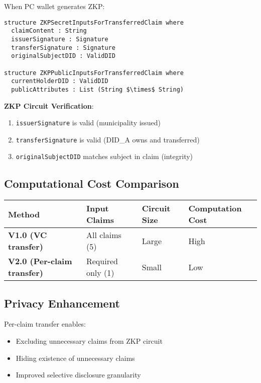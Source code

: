 When PC wallet generates ZKP:

\begin{verbatim}
structure ZKPSecretInputsForTransferredClaim where
  claimContent : String
  issuerSignature : Signature
  transferSignature : Signature
  originalSubjectDID : ValidDID

structure ZKPPublicInputsForTransferredClaim where
  currentHolderDID : ValidDID
  publicAttributes : List (String $\times$ String)
\end{verbatim}

\textbf{ZKP Circuit Verification}:
\begin{enumerate}
  \item \texttt{issuerSignature} is valid (municipality issued)
  \item \texttt{transferSignature} is valid (DID\_A owns and transferred)
  \item \texttt{originalSubjectDID} matches subject in claim (integrity)
\end{enumerate}

\subsection{Computational Cost Comparison}

\begin{table}[h]
\centering
\begin{tabular}{|l|l|l|l|}
\hline
\textbf{Method} & \textbf{Input Claims} & \textbf{Circuit Size} & \textbf{Computation Cost} \\
\hline
\textbf{V1.0 (VC transfer)} & All claims (5) & Large & High \\
\hline
\textbf{V2.0 (Per-claim transfer)} & Required only (1) & Small & Low \\
\hline
\end{tabular}
\end{table}

\subsection{Privacy Enhancement}

Per-claim transfer enables:
\begin{itemize}
  \item Excluding unnecessary claims from ZKP circuit
  \item Hiding existence of unnecessary claims
  \item Improved selective disclosure granularity
\end{itemize}

